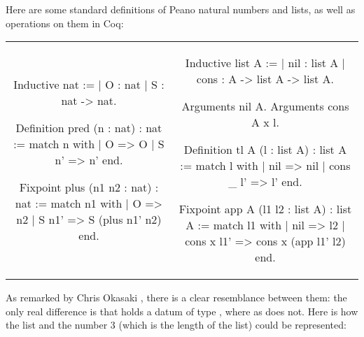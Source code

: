 \documentclass{article}
\newenvironment{no_padding_center}
    {\parskip=0pt\par\nopagebreak\centering}
    {\par\noindent}
\begin{document}
Here are some standard definitions of Peano natural numbers and lists, as well as operations on them in Coq:

\begin{no_padding_center}
    \begin{tabular}{c c}
        \begin{coq}
Inductive nat :=
  | O : nat
  | S : nat -> nat.




Definition pred (n : nat) : nat :=
  match n with
  | O => O
  | S n' => n'
  end.

Fixpoint plus (n1 n2 : nat) : nat :=
  match n1 with
  | O => n2
  | S n1' => S (plus n1' n2)
  end.
        \end{coq} &
        \begin{coq}
Inductive list A :=
  | nil : list A
  | cons : A -> list A -> list A.

Arguments nil {A}.
Arguments cons {A} x l.

Definition tl {A} (l : list A) : list A :=
  match l with
  | nil => nil
  | cons _ l' => l'
  end.

Fixpoint app {A} (l1 l2 : list A) : list A :=
  match l1 with
  | nil => l2
  | cons x l1' => cons x (app l1' l2)
  end.
        \end{coq}
    \end{tabular}
\end{no_padding_center}

As remarked by Chris Okasaki \cite{okasaki_1998}, there is a clear resemblance between them: the only real difference is that  holds a datum of type , where as  does not. Here is how the list \coqinline{[7; 5; 8]} and the number 3 (which is the length of the list) could be represented:

\begin{center}
\end{center}
\end{document}
